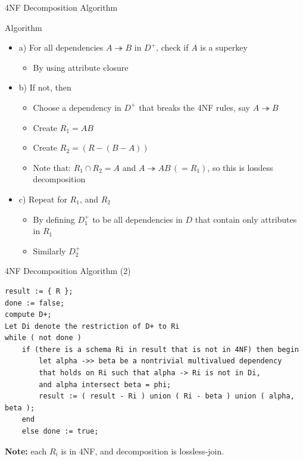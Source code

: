 \documentclass[aspectratio=169, xcolor=dvipsnames]{beamer}
\begin{document}
\begin{frame}{4NF Decomposition Algorithm}
    \begin{exampleblock}{Algorithm}
        \begin{itemize}[<+->]
            \item a) For all dependencies $A \twoheadrightarrow B$ in $D^+$, check if $A$ is a superkey
            \begin{itemize}
                \item[$\triangleright$] By using attribute closure
            \end{itemize}
            \item b) If not, then
            \begin{itemize}
                \item[$\triangleright$] Choose a dependency in $D^+$ that breaks the 4NF rules, say $A \twoheadrightarrow B$
                \item[$\triangleright$] Create $R_1 = AB$
                \item[$\triangleright$] Create $R_2 = (R - (B - A))$
                \item[$\triangleright$] Note that: $R_1 \cap R_2 = A$ and $A \twoheadrightarrow AB \, (= R_1)$, so this is lossless decomposition
            \end{itemize}
            \item c) Repeat for $R_1$, and $R_2$
            \begin{itemize}
                \item[$\triangleright$] By defining $D_1^+$ to be all dependencies in $D$ that contain only attributes in $R_1$
                \item[$\triangleright$] Similarly $D_2^+$
            \end{itemize}
        \end{itemize}
    \end{exampleblock}
\end{frame}

\begin{frame}[fragile]{4NF Decomposition Algorithm (2)}
\begin{verbatim}
result := { R };
done := false; 
compute D+; 
Let Di denote the restriction of D+ to Ri
while ( not done ) 
    if (there is a schema Ri in result that is not in 4NF) then begin 
        let alpha ->> beta be a nontrivial multivalued dependency 
        that holds on Ri such that alpha -> Ri is not in Di, 
        and alpha intersect beta = phi; 
        result := ( result - Ri ) union ( Ri - beta ) union ( alpha, beta ); 
    end 
    else done := true;
\end{verbatim}
    \textbf{Note:} each $R_i$ is in 4NF, and decomposition is lossless-join.
\end{frame}
\end{document}
